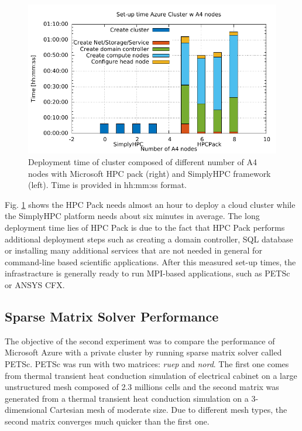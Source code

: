 \documentclass[3p,times]{elsarticle}
\begin{document}

\begin{figure}[ht]
\centering
	\includegraphics[width=.6\linewidth]{gplt-creation-simplyvshpc}
	\caption{Deployment time of cluster composed of different number of A4 nodes with Microsoft HPC pack (right) and SimplyHPC framework (left). Time is provided in hh:mm:ss format.}
	\label{fig:deployTime}
\end{figure}

Fig. \ref{fig:deployTime} shows the HPC Pack needs almost an hour to deploy a cloud cluster while the SimplyHPC platform needs about six minutes in average. The long deployment time lies of HPC Pack is due to the fact that HPC Pack performs additional deployment steps such as creating a domain controller, SQL database or installing many additional services that are not needed in general for command-line based scientific applications.
After this measured set-up times, the infrastracture is generally ready to run MPI-based applications, such as PETSc or ANSYS CFX.

\subsection{Sparse Matrix Solver Performance}
The objective of the second experiment was to compare the performance of Microsoft Azure with a private cluster by running sparse matrix solver called PETSc. PETSc was run with two matrices: \textit{ruep} and \textit{nord}. The first one comes from thermal transient heat conduction simulation of electrical cabinet on a large unstructured mesh composed of 2.3 millions cells and the second matrix was generated from a thermal transient heat conduction simulation on a 3-dimensional Cartesian mesh of moderate size. Due to different mesh types, the second matrix converges much quicker than the first one. 
\end{document}
